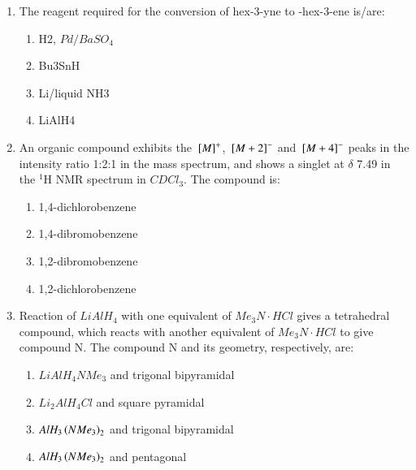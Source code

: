 \documentclass[journal,12pt,onecolumn]{IEEEtran}
\begin{document}
\begin{enumerate}
    \item The reagent required for the conversion of hex-3-yne to -hex-3-ene is/are:
    \begin{multicols}{2}
    \begin{enumerate}
        \item H2, $Pd/BaSO_{4}$
        \item Bu3SnH
        \item Li/liquid NH3
        \item LiAlH4
    \end{enumerate}
    \end{multicols}
    \hfill{}

    \item An organic compound exhibits the ${}\left[M\right]^+$, ${}\left[M+2\right]^-$ and ${}\left[M+4\right]^-$ peaks in the intensity ratio 1:2:1 in the mass spectrum, and shows a singlet at $\delta$ 7.49 in the $^1$H NMR spectrum in $CDCl_3$. The compound is:
    \begin{multicols}{2}
    \begin{enumerate}
        \item 1,4-dichlorobenzene
        \item 1,4-dibromobenzene
        \item 1,2-dibromobenzene
        \item 1,2-dichlorobenzene
    \end{enumerate}
    \end{multicols}
    \hfill{}
    
    \item Reaction of $LiAlH_4$ with one equivalent of $Me_3N \cdot HCl$ gives a tetrahedral compound, which reacts with another equivalent of $Me_3N \cdot HCl$ to give compound N. The compound N and its geometry, respectively, are:
    \begin{multicols}{2}
    \begin{enumerate}
        \item $LiAlH_4NMe_3$ and trigonal bipyramidal
        \item $Li_2AlH_4Cl$ and square pyramidal
        \item $AlH_3\left(NMe_3\right)_2$ and trigonal bipyramidal
        \item $AlH_3\left(NMe_3\right)_2$ and pentagonal
    \end{enumerate}
    \end{multicols}
    \hfill{}


\end{enumerate}
\end{document}
